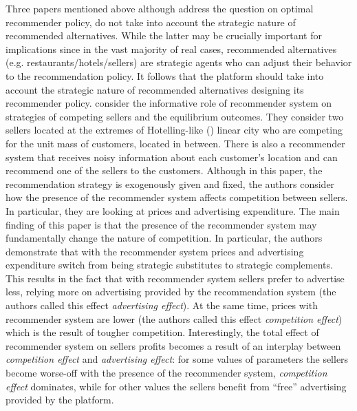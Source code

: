 \documentclass[a4paper]{article}
\begin{document}
Three papers mentioned above although address the question on optimal recommender policy, do not take into account the strategic nature of recommended alternatives. While the latter may be crucially important for implications since in the vast majority of real cases, recommended alternatives (e.g. restaurants/hotels/sellers) are strategic agents who can adjust their behavior to the recommendation policy. It follows that the platform should take into account the strategic nature of recommended alternatives designing its recommender policy.
\cite{chen2016advertising} consider the informative role of recommender system on strategies of competing sellers and the equilibrium outcomes. They consider two sellers located at the extremes of Hotelling-like (\cite{harold1929stability}) linear city who are competing for the unit mass of customers, located in between. There is also a recommender system that receives noisy information about each customer's location and can recommend one of the sellers to the customers. Although in this paper, the recommendation strategy is exogenously given and fixed, the authors consider how the presence of the recommender system affects competition between sellers. In particular, they are looking at prices and advertising expenditure. The main finding of this paper is that the presence of the recommender system may fundamentally change the nature of competition. In particular, the authors demonstrate that with the recommender system prices and advertising expenditure switch from being strategic substitutes to strategic complements. This results in the fact that with recommender system sellers prefer to advertise less, relying more on advertising provided by the recommendation system (the authors called this effect \textit{advertising effect}). At the same time, prices with recommender system are lower (the authors called this effect \textit{competition effect}) which is the result of tougher competition. Interestingly, the total effect of recommender system on sellers profits becomes a result of an interplay between \textit{competition effect} and \textit{advertising effect}: for some values of parameters the sellers become worse-off with the presence of the recommender system, \textit{competition effect} dominates, while for other values the sellers benefit from ``free'' advertising provided by the platform.
\end{document}

